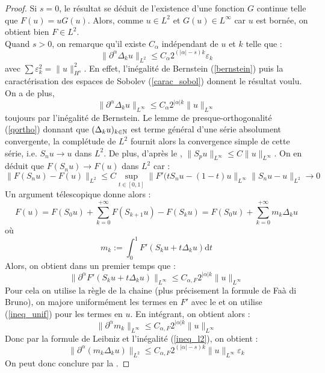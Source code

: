 \documentclass[11pt,a4paper]{article}
\begin{document}
\begin{proof}
Si $s=0$, le résultat se déduit de l'existence d'une fonction $G$ continue telle que $F(u)=uG(u)$. Alors, comme $u\in L^2$ et $G(u) \in L^{\infty}$ car $u$ est bornée, on obtient bien $F\in L^2$. \\
Quand $s>0$, on remarque qu'il existe $C_\alpha$  indépendant de $u$ et $k$ telle que  : 
\begin{equation}\label{ineq_l2}
\|\partial^\alpha \Delta_k u \|_{L^2} \leq C_\alpha 2^{(|\alpha|-s)k} \varepsilon_k
\end{equation}
avec $\sum \varepsilon_k^2 =  \|u\|_{H^s}^2$. En effet, l'inégalité de Bernstein (\ref{bernstein}) puis la caractérisation des espaces de Sobolev (\ref{carac_sobol}) donnent le résultat voulu. On a de plus,
\begin{equation}\label{ineq_unif}
\|\partial^\alpha \Delta_k u \|_{L^{\infty}} \leq C_\alpha 2^{|\alpha|k} \|u\|_{L^{\infty}}
\end{equation}
toujours par l'inégalité de Bernstein. Le lemme de presque-orthogonalité (\ref{qortho}) donnant que $(\Delta_k u)_{k\in \mathbb N}$ est terme général d'une série absolument convergente, la complétude de $L^2$ fournit alors la convergence simple de cette série, i.e. $S_nu \to u$ dans $L^2$. De plus, d'après le ,  $\|S_pu\|_{L^\infty} \leq C \|u\|_{L^\infty}$. On en déduit que $F(S_nu) \to F(u)$ dans $L^2$ car :
\[ \| F(S_nu) - F(u)\|_{L^2} \leq C \sup_{t\in[0,1]} \|F'(tS_nu- (1-t)u \|_{L^\infty}\|S_nu-u\|_{L^2} \to 0 \]
Un argument télescopique donne alors : 
\begin{equation}\label{telesc}
F(u) = F(S_0 u) + \sum_{k=0}^{+\infty} F(S_{k+1} u) - F(S_k u) = F(S_0 u) + \sum_{k=0}^{+\infty} m_k \Delta_k u
\end{equation}
où \[m_k := \int_0^1 F'(S_ku + t\Delta_ku)\mathrm{d}t\]
Alors, on obtient dans un premier temps que : 
\begin{equation*}
\| \partial^\alpha F'(S_ku + t\Delta_ku)\|_{L^{\infty}} \leq C_{\alpha,F} 2^{|\alpha|k} \|u\|_{L^{\infty}}
\end{equation*}
Pour cela on utilise la règle de la chaine (plus précisement la formule de Faà di Bruno), on majore uniformément les termes en $F'$ avec le  et on utilise (\ref{ineq_unif}) pour les termes en $u$.
En intégrant, on obtient alors :
\begin{equation}\label{majint}
\|\partial^\alpha m_k \|_{L^\infty} \leq C_{\alpha,F} 2^{|\alpha|k} \|u\|_{L^{\infty}}
\end{equation}
Donc par la formule de Leibniz et l'inégalité (\ref{ineq_l2}), on obtient :
\begin{equation*}
\|\partial^\alpha(m_k \Delta_k u) \|_{L^2} \leq C_{\alpha,F} 2^{(|\alpha|-s)k} \|u\|_{L^{\infty}} \varepsilon_k
\end{equation*}
On peut donc conclure par la .
\end{proof}
\end{document}

